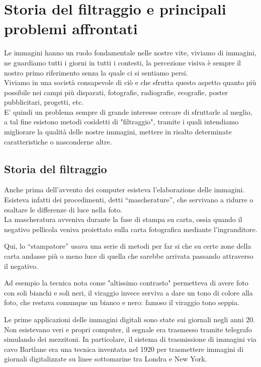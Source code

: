 \chapter{Storia del filtraggio e principali problemi affrontati}
Le immagini hanno un ruolo fondamentale nelle nostre vite, viviamo di immagini, ne guardiamo tutti i giorni in tutti i contesti, la percezione visiva è sempre il nostro primo riferimento senza la quale ci si sentiamo persi.\\
Viviamo in una società consapevole di ciò e che sfrutta questo aspetto quanto più possibile nei campi più disparati, fotografie, radiografie, ecografie, poster pubblicitari, progetti, etc.\\
E' quindi un problema sempre di grande interesse cercare di sfruttarle al meglio, a tal fine esistono metodi cosìdetti di "filtraggio", tramite i quali intendiamo migliorare la qualità delle nostre immagini, mettere in risalto determinate caratteristiche o nasconderne altre.
\section{Storia del filtraggio}
Anche prima dell'avvento dei computer esisteva l'elaborazione delle immagini. Esisteva infatti dei procedimenti, detti “mascherature”, che servivano a ridurre o esaltare le differenze di luce nella foto.\\La mascheratura avveniva durante la fase di stampa su carta, ossia quando il negativo pellicola veniva proiettato sulla carta fotografica mediante l’ingranditore.

\vspace{1em}\noindent 
Qui, lo “stampatore” usava una serie di metodi per far si che su certe zone della carta andasse più o meno luce di quella che sarebbe arrivata passando attraverso il negativo.

Ad esempio la tecnica nota come "altissimo contrasto" permetteva di avere foto con soli bianchi e soli neri, il viraggio invece serviva a dare un tono di colore alla foto, che restava comunque un bianco e nero: famoso il viraggio tono seppia.

\vspace{1em} \noindent
Le prime applicazioni delle immagini digitali sono state sui giornali negli anni 20. Non esistevano veri e propri computer, il segnale era trasmesso tramite telegrafo simulando dei mezzitoni.
In particolare, il sistema di trasmissione di immagini via cavo Bartlane era una tecnica inventata nel 1920 per trasmettere immagini di giornali digitalizzate su linee sottomarine tra Londra e New York.

